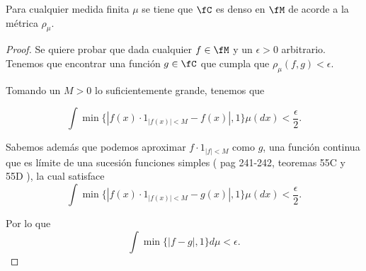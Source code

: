 \begin{lema}
    Para cualquier medida finita $\mu$ se tiene que $\fC$ es denso en 
    $\fM$ de acorde a la métrica $\rho_\mu$.
\end{lema}
\begin{proof}
    Se quiere probar que dada cualquier $f \in \fM$ y un $\epsilon > 0$ arbitrario. 
    Tenemos que encontrar una función $g \in \fC$ que cumpla que 
    $\rho_{\mu}(f, g) < \epsilon$. 

    Tomando un $M > 0$ lo suficientemente grande, tenemos que 
    
    \begin{equation}
        \int \min \{ |f(x)\cdot 1_{|f(x)| < M} - f(x)|, 1\} \mu(dx) 
        < \frac{\epsilon}{2}. 
    \end{equation}

    Sabemos además que podemos aproximar $f\cdot 1_{|f| < M}$ como $g$, una función continua que es límite de una sucesión 
    funciones simples ( pag 241-242,  teoremas 55C y 55D \cite{nla.cat-vn1819421}), 
    la cual satisface 
    \begin{equation}
        \int \min \{ |f(x)\cdot 1_{|f(x)| < M} - g(x)|, 1\} \mu(dx) 
        < \frac{\epsilon}{2}. 
    \end{equation}

     Por lo que 
     \begin{equation}
        \int \min \{ |f  - g|, 1\} d\mu 
        < \epsilon. 
    \end{equation}
\end{proof}









